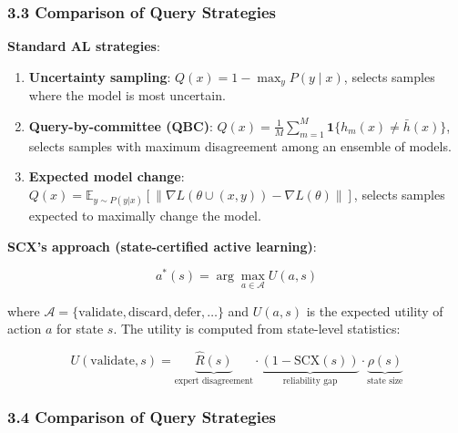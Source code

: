 \documentclass[
  12pt,
]{ctexart}
\begin{document}
\subsubsection{3.3 Comparison of Query
Strategies}\label{comparison-of-query-strategies}

\textbf{Standard AL strategies}:

\begin{enumerate}
\def\labelenumi{\arabic{enumi}.}
\item
  \textbf{Uncertainty sampling}: \(Q(x) = 1 - \max_y P(y \mid x)\),
  selects samples where the model is most uncertain.
\item
  \textbf{Query-by-committee (QBC)}:
  \(Q(x) = \frac{1}{M}\sum_{m=1}^M \mathbf{1}\{h_m(x) \neq \bar{h}(x)\}\),
  selects samples with maximum disagreement among an ensemble of models.
\item
  \textbf{Expected model change}:
  \(Q(x) = \mathbb{E}_{y \sim P(y|x)}[\|\nabla L(\theta \cup (x,y)) - \nabla L(\theta)\|]\),
  selects samples expected to maximally change the model.
\end{enumerate}

\textbf{SCX's approach (state-certified active learning)}:

\[a^*(s) = \arg\max_{a \in \mathcal{A}} U(a, s)\]

where
\(\mathcal{A} = \{\text{validate}, \text{discard}, \text{defer}, \ldots\}\)
and \(U(a, s)\) is the expected utility of action \(a\) for state \(s\).
The utility is computed from state-level statistics:

\[U(\text{validate}, s) = \underbrace{\hat{R}(s)}_{\text{expert disagreement}} \cdot \underbrace{(1 - \text{SCX}(s))}_{\text{reliability gap}} \cdot \underbrace{\rho(s)}_{\text{state size}}\]

\subsubsection{3.4 Comparison of Query
Strategies}\label{comparison-of-query-strategies-1}
\end{document}
